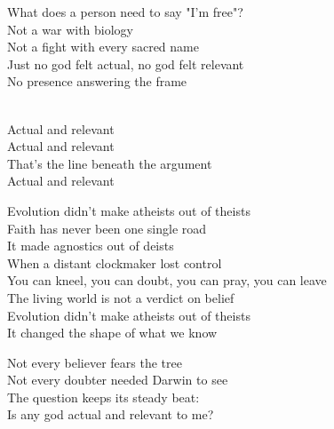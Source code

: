 \begin{lyrics}
What does a person need to say "I'm free"?\\
Not a war with biology\\
Not a fight with every sacred name\\
Just no god felt actual, no god felt relevant\\
No presence answering the frame

\\
Actual and relevant\\
Actual and relevant\\
That's the line beneath the argument\\
Actual and relevant

Evolution didn't make atheists out of theists\\
Faith has never been one single road\\
It made agnostics out of deists\\
When a distant clockmaker lost control\\
You can kneel, you can doubt, you can pray, you can leave\\
The living world is not a verdict on belief\\
Evolution didn't make atheists out of theists\\
It changed the shape of what we know

Not every believer fears the tree\\
Not every doubter needed Darwin to see\\
The question keeps its steady beat:\\
Is any god actual and relevant to me?
\end{lyrics}

